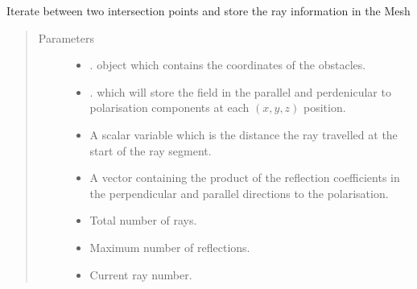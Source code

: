 \documentclass[letterpaper,10pt,english]{sphinxmanual}
\begin{document}
\begin{fulllineitems}
\begin{fulllineitems}
\label{\detokenize{index:Rays.Ray.mesh_power_singleray}}
Iterate between two intersection points and store the ray     information in the Mesh
\begin{quote}\begin{description}
\item[{Parameters}] \leavevmode\begin{itemize}
\item {} 
 \textendash{} {\hyperref[\detokenize{index:module-Room}]{}}.  object which     contains the co\sphinxhyphen{}ordinates of the obstacles.

\item {} 
 \textendash{} {\hyperref[\detokenize{index:module-DictionarySparseMatrix}]{}}.      which will store the field in the parallel and perdenicular to     polarisation components at each \((x,y,z)\) position.

\item {} 
 \textendash{} A scalar variable which is the distance the ray     travelled at the start of the ray segment.

\item {} 
 \textendash{} A vector containing the product of the reflection     coefficients in the perpendicular and parallel directions to the     polarisation.

\item {} 
 \textendash{} Total number of rays.

\item {} 
 \textendash{} Maximum number of reflections.

\item {} 
 \textendash{} Current ray number.

\end{itemize}


\end{description}
\end{quote}
\end{fulllineitems}
\end{fulllineitems}
\end{document}
